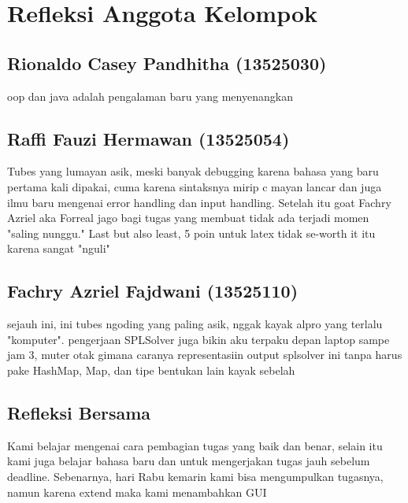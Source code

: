 \documentclass[12pt,a4paper]{report}
\begin{document}
\section{Refleksi Anggota Kelompok}
 
\subsection{Rionaldo Casey Pandhitha (13525030)}
oop dan java adalah pengalaman baru yang menyenangkan


\subsection{Raffi Fauzi Hermawan (13525054)}
 Tubes yang lumayan asik, meski banyak debugging karena bahasa yang baru pertama kali dipakai, cuma karena sintaksnya mirip c mayan lancar dan juga ilmu baru mengenai error handling dan input handling. Setelah itu goat Fachry Azriel aka Forreal jago bagi tugas yang membuat tidak ada terjadi momen "saling nunggu." Last but also least, 5 poin untuk latex tidak se-worth it itu karena sangat "nguli"

 
\subsection{Fachry Azriel Fajdwani (13525110)}
sejauh ini, ini tubes ngoding yang paling asik, nggak kayak alpro yang terlalu "komputer". pengerjaan SPLSolver juga bikin aku terpaku depan laptop sampe jam 3, muter otak gimana caranya representasiin output splsolver ini tanpa harus pake HashMap, Map, dan tipe bentukan lain kayak sebelah

\subsection{Refleksi Bersama}
 
Kami belajar mengenai cara pembagian tugas yang baik dan benar, selain itu kami juga belajar bahasa baru dan untuk mengerjakan tugas jauh sebelum deadline. Sebenarnya, hari Rabu kemarin kami bisa mengumpulkan tugasnya, namun karena extend maka kami menambahkan GUI

\renewcommand{\bibname}{Daftar Pustaka}
\end{document}
